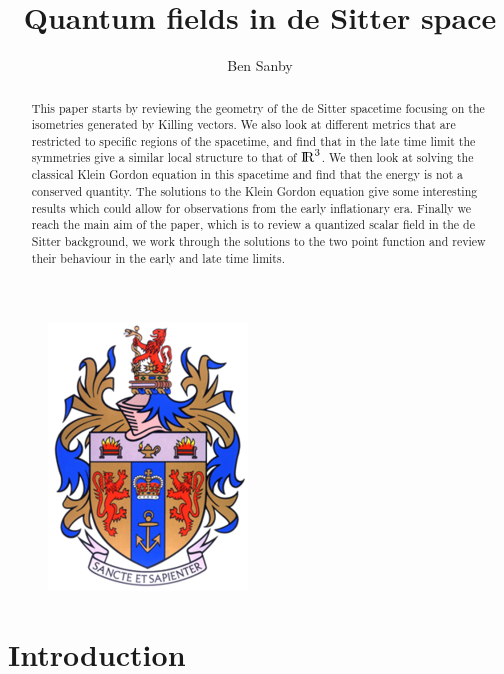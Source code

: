 \documentclass[a4paper,11pt]{article}
\title{Quantum fields in de Sitter space}
\author{Ben Sanby}
\numberwithin{equation}{section}
\numberwithin{figure}{section}
\begin{document}
\begin{large}

\clearpage
\maketitle
\thispagestyle{empty}
\begin{figure}[h]
    \centering
    \vspace{100mm}
    \includegraphics[width=0.2\columnwidth]{kcl_logo.png}
\end{figure}

\newpage

\begin{abstract}
    This paper starts by reviewing the geometry of the de Sitter spacetime focusing on the isometries generated by Killing vectors. We also look at different metrics that are restricted to specific regions of the spacetime, and find that in the late time limit the symmetries give a similar local structure to that of ${\rm I\!R}^3$. We then look at solving the classical Klein Gordon equation in this spacetime and find that the energy is not a conserved quantity. The solutions to the Klein Gordon equation give some interesting results which could allow for observations from the early inflationary era. Finally we reach the main aim of the paper, which is to review a quantized scalar field in the de Sitter background, we work through the solutions to the two point function and review their behaviour in the early and late time limits.
\end{abstract}

\newpage

\tableofcontents


\newpage

\section{Introduction}


\end{large}
\end{document}
